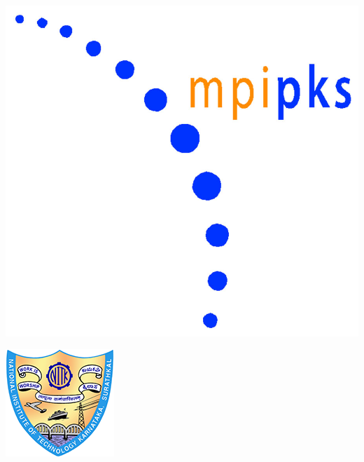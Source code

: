 \documentclass[a0,portrait]{a0poster}
\begin{document}
\begin{minipage}[b]{0.125\linewidth}
\includegraphics[width=\linewidth]{mpipks_logo.png}
\end{minipage}
\hspace*{0.5in}
\begin{minipage}[b]{0.125\linewidth}
\includegraphics[width=\linewidth]{nitk_logo_color_v1.png}
\end{minipage}
\end{document}
